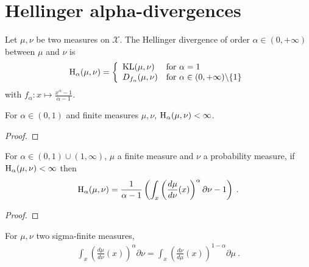 \chapter{Hellinger alpha-divergences}

\begin{definition}
  \label{def:hellingerAlpha}
  \leanok
  Let $\mu, \nu$ be two measures on $\mathcal X$. The Hellinger divergence of order $\alpha \in (0,+\infty)$ between $\mu$ and $\nu$ is
  \begin{align*}
  \operatorname{H}_\alpha(\mu, \nu) = \left\{
  \begin{array}{ll}
    \operatorname{KL}(\mu, \nu) & \text{for } \alpha = 1
    \\
    D_{f_\alpha}(\mu, \nu) & \text{for } \alpha \in (0,+\infty) \backslash \{1\}
  \end{array}\right.
  \end{align*}
  with $f_\alpha : x \mapsto \frac{x^{\alpha} - 1}{\alpha - 1}$.
\end{definition}

\begin{lemma}
  \label{lem:hellingerAlpha_ne_top_of_lt_one}
  \leanok
  For $\alpha \in (0, 1)$ and finite measures $\mu, \nu$, $\operatorname{H}_\alpha(\mu, \nu) < \infty$.
\end{lemma}

\begin{proof}\leanok
\uses{}
\end{proof}

\begin{lemma}
  \label{lem:hellingerAlpha_eq_integral}
  \leanok
  For $\alpha \in (0,1)\cup(1, \infty)$, $\mu$ a finite measure and $\nu$ a probability measure, if $\operatorname{H}_\alpha(\mu, \nu) < \infty$ then
  \begin{align*}
  \operatorname{H}_\alpha(\mu, \nu) = \frac{1}{\alpha - 1} \left( \int_x \left(\frac{d \mu}{d \nu}(x)\right)^\alpha \partial \nu - 1 \right)
  \: .
  \end{align*}
\end{lemma}

\begin{proof}\leanok
\uses{}
\end{proof}

\begin{lemma}
  \label{lem:integral_rpow_rnDeriv}
  \leanok
  \uses{}
  For $\mu, \nu$ two sigma-finite measures,
  \begin{align*}
  \int_x \left(\frac{d \mu}{d \nu}(x)\right)^\alpha \partial \nu
  = \int_x \left(\frac{d \nu}{d \mu}(x)\right)^{1 - \alpha} \partial \mu
  \: .
  \end{align*}
\end{lemma}

